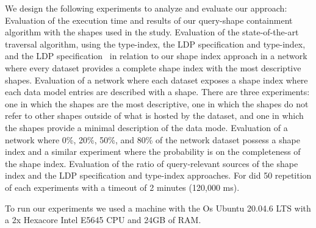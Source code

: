 We design the following experiments to analyze and evaluate our approach:
Evaluation of the execution time and results of our query-shape containment algorithm with the shapes used in the study.
Evaluation of the state-of-the-art traversal algorithm, using the type-index, the LDP specification and type-index, and the LDP specification~\cite{Taelman2023} in relation to our shape index approach in a network where every dataset provides a complete shape index with the most descriptive shapes.
Evaluation of a network where each dataset exposes a shape index where each data model entries are described with a shape. 
There are three experiments: one in which the shapes are the most descriptive, one in which the shapes do not refer to other shapes outside of what is hosted by the dataset, and one in which the shapes provide a minimal description of the data mode.
Evaluation of a network where 0\%, 20\%, 50\%, and 80\% of the network dataset possess a shape index and a similar experiment where the probability is on the completeness of the shape index.
Evaluation of the ratio of query-relevant sources of the shape index and the LDP specification and type-index approaches. 
For did 50 repetition of each experiments with a timeout of 2 minutes (120,000 ms).

To run our experiments we used a machine with the Os Ubuntu 20.04.6 LTS with a 2x Hexacore Intel E5645 CPU and 24GB of RAM.

\iffalse
PROVIDE LINK FOR EXPERIMENTS AND SHAPES

102x pcgen3 nodes
https://doc.ilabt.imec.be/ilabt/virtualwall/hardware.html#virtual-wall-2
\fi
